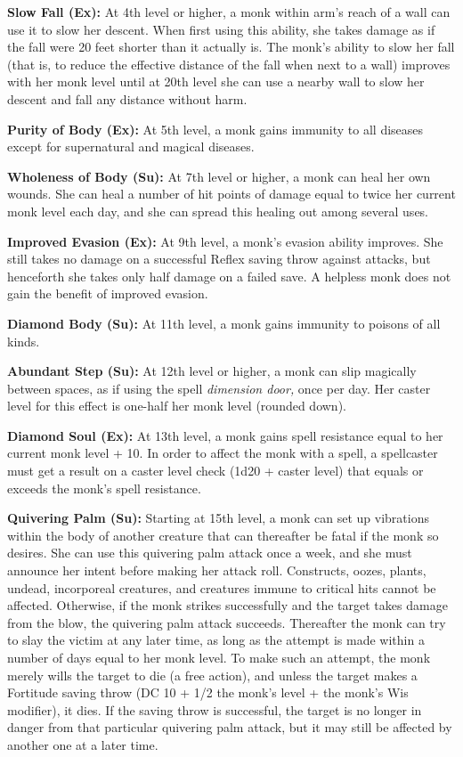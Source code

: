 \documentclass{article}
\begin{document}
\textbf{Slow Fall (Ex): }At 4th level or higher, a monk within arm's reach of a 
wall can use it to slow her descent. When first using this ability, she takes damage 
as if the fall were 20 feet shorter than it actually is. The monk's ability to 
slow her fall (that is, to reduce the effective distance of the fall when next 
to a wall) improves with her monk level until at 20th level she can use a nearby 
wall to slow her descent and fall any distance without harm.

\textbf{Purity of Body (Ex):} At 5th level, a monk gains immunity to all diseases 
except for supernatural and magical diseases.

\textbf{Wholeness of Body (Su):} At 7th level or higher, a monk can heal her own 
wounds. She can heal a number of hit points of damage equal to twice her current 
monk level each day, and she can spread this healing out among several uses.

\textbf{Improved Evasion (Ex):} At 9th level, a monk's evasion ability improves. 
She still takes no damage on a successful Reflex saving throw against attacks, 
but henceforth she takes only half damage on a failed save. A helpless monk does 
not gain the benefit of improved evasion.

\textbf{Diamond Body (Su):} At 11th level, a monk gains immunity to poisons of 
all kinds.

\textbf{Abundant Step (Su):} At 12th level or higher, a monk can slip magically 
between spaces, as if using the spell \textit{dimension door, }once per day. Her 
caster level for this effect is one-half her monk level (rounded down).

\textbf{Diamond Soul (Ex):} At 13th level, a monk gains spell resistance equal 
to her current monk level + 10. In order to affect the monk with a spell, a spellcaster 
must get a result on a caster level check (1d20 + caster level) that equals or 
exceeds the monk's spell resistance.

\textbf{Quivering Palm (Su):} Starting at 15th level, a monk can set up vibrations 
within the body of another creature that can thereafter be fatal if the monk so 
desires. She can use this quivering palm attack once a week, and she must announce 
her intent before making her attack roll. Constructs, oozes, plants, undead, incorporeal 
creatures, and creatures immune to critical hits cannot be affected. Otherwise, 
if the monk strikes successfully and the target takes damage from the blow, the 
quivering palm attack succeeds. Thereafter the monk can try to slay the victim 
at any later time, as long as the attempt is made within a number of days equal 
to her monk level. To make such an attempt, the monk merely wills the target to 
die (a free action), and unless the target makes a Fortitude saving throw (DC 10 
+ 1/2 the monk's level + the monk's Wis modifier), it dies. If the saving throw 
is successful, the target is no longer in danger from that particular quivering 
palm attack, but it may still be affected by another one at a later time.
\end{document}
